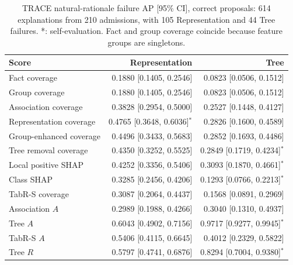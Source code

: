 \begin{table}[!tbp]\centering\scriptsize
\caption{TRACE natural-rationale failure AP [95\% CI], correct proposals: 614 explanations from 210 admissions, with 105 Representation and 44 Tree failures. *: self-evaluation. Fact and group coverage coincide because feature groups are singletons.}\label{tab:trace-natural}
\begin{tabular}{lrr}\toprule
Score & Representation & Tree \\ \midrule
Fact coverage & 0.1880 [0.1405, 0.2546] & 0.0823 [0.0506, 0.1512] \\
Group coverage & 0.1880 [0.1405, 0.2546] & 0.0823 [0.0506, 0.1512] \\
Association coverage & 0.3828 [0.2954, 0.5000] & 0.2527 [0.1448, 0.4127] \\
Representation coverage & 0.4765 [0.3648, 0.6036]$^{*}$ & 0.2826 [0.1600, 0.4589] \\
Group-enhanced coverage & 0.4496 [0.3433, 0.5683] & 0.2852 [0.1693, 0.4486] \\
Tree removal coverage & 0.4350 [0.3252, 0.5525] & 0.2849 [0.1719, 0.4234]$^{*}$ \\
Local positive SHAP & 0.4252 [0.3356, 0.5406] & 0.3093 [0.1870, 0.4661]$^{*}$ \\
Class SHAP & 0.3285 [0.2456, 0.4206] & 0.1293 [0.0766, 0.2213]$^{*}$ \\
TabR-S coverage & 0.3087 [0.2064, 0.4437] & 0.1568 [0.0891, 0.2969] \\
Association $A$ & 0.2989 [0.1988, 0.4266] & 0.3040 [0.1310, 0.4937] \\
Tree $A$ & 0.6043 [0.4902, 0.7156] & 0.9717 [0.9277, 0.9945]$^{*}$ \\
TabR-S $A$ & 0.5406 [0.4115, 0.6645] & 0.4012 [0.2329, 0.5822] \\
Tree $R$ & 0.5797 [0.4741, 0.6876] & 0.8294 [0.7004, 0.9380]$^{*}$ \\
\bottomrule\end{tabular}
\end{table}
